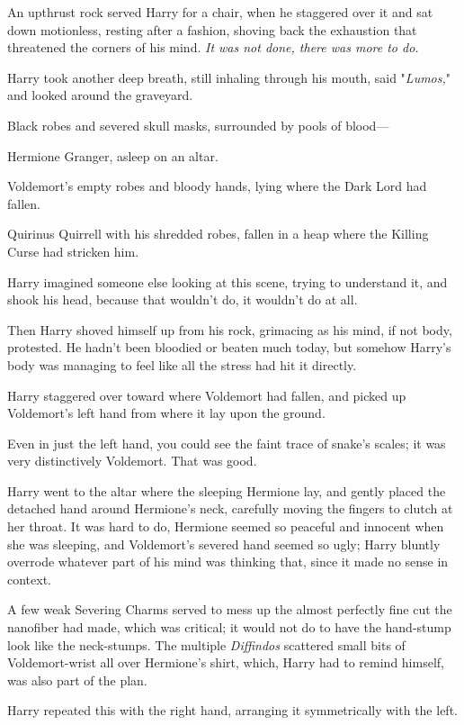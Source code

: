 An upthrust rock served Harry for a chair, when he staggered over it and sat
down motionless, resting after a fashion, shoving back the exhaustion that
threatened the corners of his mind. \emph{It was not done, there was more to
do.}

Harry took another deep breath, still inhaling through his mouth, said
"\emph{Lumos,}" and looked around the graveyard.

Black robes and severed skull masks, surrounded by pools of blood---

Hermione Granger, asleep on an altar.

Voldemort's empty robes and bloody hands, lying where the Dark Lord had fallen.

Quirinus Quirrell with his shredded robes, fallen in a heap where the Killing
Curse had stricken him.

Harry imagined someone else looking at this scene, trying to understand it, and
shook his head, because that wouldn't do, it wouldn't do at all.

Then Harry shoved himself up from his rock, grimacing as his mind, if not body,
protested. He hadn't been bloodied or beaten much today, but somehow Harry's
body was managing to feel like all the stress had hit it directly.

Harry staggered over toward where Voldemort had fallen, and picked up
Voldemort's left hand from where it lay upon the ground.

Even in just the left hand, you could see the faint trace of snake's scales; it
was very distinctively Voldemort. That was good.

Harry went to the altar where the sleeping Hermione lay, and gently placed the
detached hand around Hermione's neck, carefully moving the fingers to clutch at
her throat. It was hard to do, Hermione seemed so peaceful and innocent when
she was sleeping, and Voldemort's severed hand seemed so ugly; Harry bluntly
overrode whatever part of his mind was thinking that, since it made no sense in
context.

A few weak Severing Charms served to mess up the almost perfectly fine cut the
nanofiber had made, which was critical; it would not do to have the hand-stump
look like the neck-stumps. The multiple \emph{Diffindos} scattered small bits
of Voldemort-wrist all over Hermione's shirt, which, Harry had to remind
himself, was also part of the plan.

Harry repeated this with the right hand, arranging it symmetrically with the
left.

